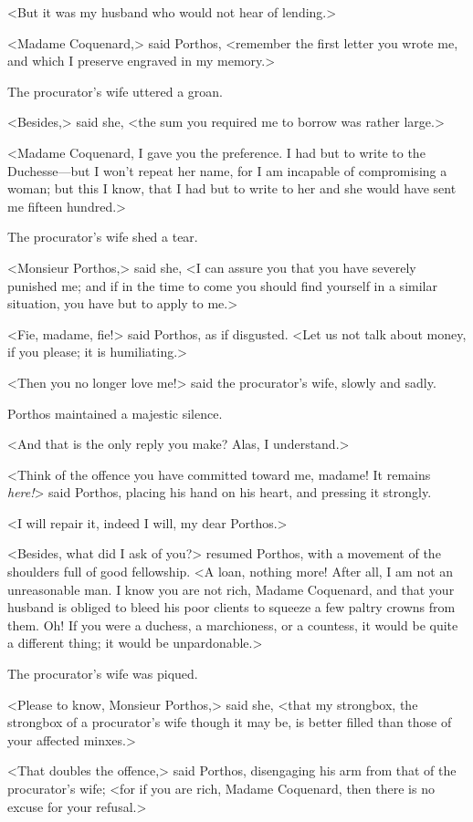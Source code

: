 <But it was my husband who would not hear of lending.> 

<Madame Coquenard,> said Porthos, <remember the first letter you wrote me, and which I preserve engraved in my memory.> 

The procurator's wife uttered a groan. 

<Besides,> said she, <the sum you required me to borrow was rather large.> 

<Madame Coquenard, I gave you the preference. I had but to write to the Duchesse---but I won't repeat her name, for I am incapable of compromising a woman; but this I know, that I had but to write to her and she would have sent me fifteen hundred.> 

The procurator's wife shed a tear. 

<Monsieur Porthos,> said she, <I can assure you that you have severely punished me; and if in the time to come you should find yourself in a similar situation, you have but to apply to me.> 

<Fie, madame, fie!> said Porthos, as if disgusted. <Let us not talk about money, if you please; it is humiliating.> 

<Then you no longer love me!> said the procurator's wife, slowly and sadly. 

Porthos maintained a majestic silence. 

<And that is the only reply you make? Alas, I understand.> 

<Think of the offence you have committed toward me, madame! It remains \textit{here!}> said Porthos, placing his hand on his heart, and pressing it strongly. 

<I will repair it, indeed I will, my dear Porthos.> 

<Besides, what did I ask of you?> resumed Porthos, with a movement of the shoulders full of good fellowship. <A loan, nothing more! After all, I am not an unreasonable man. I know you are not rich, Madame Coquenard, and that your husband is obliged to bleed his poor clients to squeeze a few paltry crowns from them. Oh! If you were a duchess, a marchioness, or a countess, it would be quite a different thing; it would be unpardonable.> 

The procurator's wife was piqued. 

<Please to know, Monsieur Porthos,> said she, <that my strongbox, the strongbox of a procurator's wife though it may be, is better filled than those of your affected minxes.> 

<That doubles the offence,> said Porthos, disengaging his arm from that of the procurator's wife; <for if you are rich, Madame Coquenard, then there is no excuse for your refusal.> 

